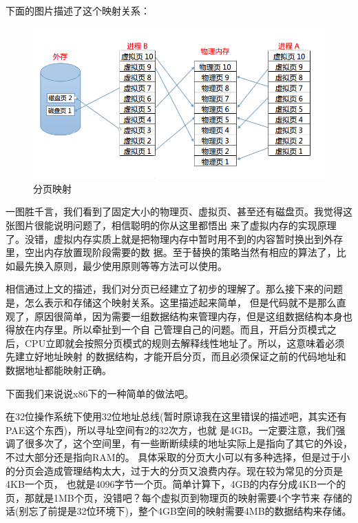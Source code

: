 \par 下面的图片描述了这个映射关系：

\begin{figure}[ht]
      \centering
      \includegraphics[scale=0.35]{picture/chapt9/PAGE_MAP.png}
      \caption{分页映射}
\end{figure}

\par 一图胜千言，我们看到了固定大小的物理页、虚拟页、甚至还有磁盘页。我觉得这张图片很能说明问题了，相信聪明的你从这里都悟出\allowbreak
来了虚拟内存的实现原理了。没错，虚拟内存实质上就是把物理内存中暂时用不到的内容暂时换出到外存里，空出内存放置现阶段需要的数\allowbreak
据。至于替换的策略当然有相应的算法了，比如最先换入原则，最少使用原则等等方法可以使用。

\par 相信通过上文的描述，我们对分页已经建立了初步的理解了。那么接下来的问题是，怎么表示和存储这个映射关系。这里描述起来简单，\allowbreak
但是代码就不是那么直观了，原因很简单，因为需要一组数据结构来管理内存，但是这组数据结构本身也得放在内存里。所以牵扯到一个自\allowbreak
己管理自己的问题。而且，开启分页模式之后，CPU立即就会按照分页模式的规则去解释线性地址了。所以，这意味着必须先建立好地址映射\allowbreak
的数据结构，才能开启分页，而且必须保证之前的代码地址和数据地址都能映射正确。

\par 下面我们来说说x86下的一种简单的做法吧。

\par 在32位操作系统下使用32位地址总线(暂时原谅我在这里错误的描述吧，其实还有PAE这个东西)，所以寻址空间有2的32次方，也就\allowbreak
是4GB。一定要注意，我们强调了很多次了，这个空间里，有一些断断续续的地址实际上是指向了其它的外设，不过大部分还是指向RAM的。\allowbreak
具体采取的分页大小可以有多种选择，但是过于小的分页会造成管理结构太大，过于大的分页又浪费内存。现在较为常见的分页是4KB一个页，\allowbreak
也就是4096字节一个页。简单计算下，4GB的内存分成4KB一个的页，那就是1MB个页，没错吧？每个虚拟页到物理页的映射需要4个字节来\allowbreak
存储的话(别忘了前提是32位环境下)，整个4GB空间的映射需要4MB的数据结构来存储。

